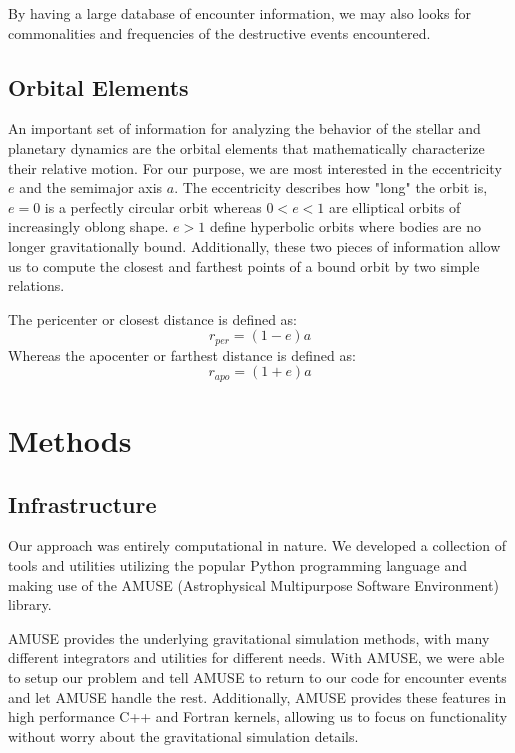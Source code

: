 \documentclass[12pt]{article}
\begin{document}
By having a large database of encounter information, we may also looks for commonalities
and frequencies of the destructive events encountered. 


\subsection{Orbital Elements}

    An important set of information for analyzing the behavior of the stellar and
    planetary dynamics are the orbital elements that mathematically 
    characterize their relative motion. 
    For our purpose, we are most interested in the eccentricity $e$ and the
    semimajor axis $a$. The eccentricity describes how "long" the orbit is, $e=0$
    is a perfectly circular orbit whereas $0<e<1$ are elliptical orbits of increasingly
    oblong shape. $e>1$ define hyperbolic orbits where bodies are no longer
    gravitationally bound. Additionally, these two pieces of information allow us to 
    compute the closest and farthest points of a bound orbit by two simple relations.

    The pericenter or closest distance is defined as:
    \begin{equation}
        r_{per} = (1 - e) a
    \end{equation}
    Whereas the apocenter or farthest distance is defined as:
    \begin{equation}
        r_{apo} = (1 + e) a
    \end{equation}


\section{Methods}

    \subsection{Infrastructure}

    Our approach was entirely computational in nature. We developed a collection of tools
    and utilities utilizing the popular Python programming language and making use
    of the AMUSE (Astrophysical Multipurpose Software Environment) library. 

    AMUSE provides the underlying gravitational simulation methods, with many different
    integrators and utilities for different needs. With AMUSE, we were able to 
    setup our problem and tell AMUSE to return to our code for encounter events and
    let AMUSE handle the rest. Additionally, AMUSE provides these features in high
    performance C++ and Fortran kernels, allowing us to focus on functionality without
    worry about the gravitational simulation details.
\end{document}
